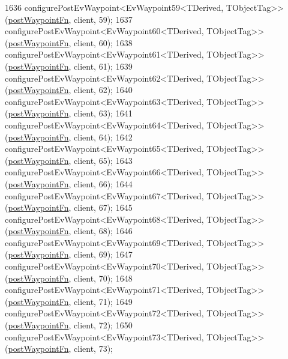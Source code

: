 \begin{DoxyCode}
1636     configurePostEvWaypoint<EvWaypoint59<TDerived, TObjectTag>>(\hyperlink{classsmacc_1_1WaypointEventDispatcher_a6bccf6a93a827634b7b5e67ac0e4ec57}{postWaypointFn}, client, 59);
1637     configurePostEvWaypoint<EvWaypoint60<TDerived, TObjectTag>>(\hyperlink{classsmacc_1_1WaypointEventDispatcher_a6bccf6a93a827634b7b5e67ac0e4ec57}{postWaypointFn}, client, 60);
1638     configurePostEvWaypoint<EvWaypoint61<TDerived, TObjectTag>>(\hyperlink{classsmacc_1_1WaypointEventDispatcher_a6bccf6a93a827634b7b5e67ac0e4ec57}{postWaypointFn}, client, 61);
1639     configurePostEvWaypoint<EvWaypoint62<TDerived, TObjectTag>>(\hyperlink{classsmacc_1_1WaypointEventDispatcher_a6bccf6a93a827634b7b5e67ac0e4ec57}{postWaypointFn}, client, 62);
1640     configurePostEvWaypoint<EvWaypoint63<TDerived, TObjectTag>>(\hyperlink{classsmacc_1_1WaypointEventDispatcher_a6bccf6a93a827634b7b5e67ac0e4ec57}{postWaypointFn}, client, 63);
1641     configurePostEvWaypoint<EvWaypoint64<TDerived, TObjectTag>>(\hyperlink{classsmacc_1_1WaypointEventDispatcher_a6bccf6a93a827634b7b5e67ac0e4ec57}{postWaypointFn}, client, 64);
1642     configurePostEvWaypoint<EvWaypoint65<TDerived, TObjectTag>>(\hyperlink{classsmacc_1_1WaypointEventDispatcher_a6bccf6a93a827634b7b5e67ac0e4ec57}{postWaypointFn}, client, 65);
1643     configurePostEvWaypoint<EvWaypoint66<TDerived, TObjectTag>>(\hyperlink{classsmacc_1_1WaypointEventDispatcher_a6bccf6a93a827634b7b5e67ac0e4ec57}{postWaypointFn}, client, 66);
1644     configurePostEvWaypoint<EvWaypoint67<TDerived, TObjectTag>>(\hyperlink{classsmacc_1_1WaypointEventDispatcher_a6bccf6a93a827634b7b5e67ac0e4ec57}{postWaypointFn}, client, 67);
1645     configurePostEvWaypoint<EvWaypoint68<TDerived, TObjectTag>>(\hyperlink{classsmacc_1_1WaypointEventDispatcher_a6bccf6a93a827634b7b5e67ac0e4ec57}{postWaypointFn}, client, 68);
1646     configurePostEvWaypoint<EvWaypoint69<TDerived, TObjectTag>>(\hyperlink{classsmacc_1_1WaypointEventDispatcher_a6bccf6a93a827634b7b5e67ac0e4ec57}{postWaypointFn}, client, 69);
1647     configurePostEvWaypoint<EvWaypoint70<TDerived, TObjectTag>>(\hyperlink{classsmacc_1_1WaypointEventDispatcher_a6bccf6a93a827634b7b5e67ac0e4ec57}{postWaypointFn}, client, 70);
1648     configurePostEvWaypoint<EvWaypoint71<TDerived, TObjectTag>>(\hyperlink{classsmacc_1_1WaypointEventDispatcher_a6bccf6a93a827634b7b5e67ac0e4ec57}{postWaypointFn}, client, 71);
1649     configurePostEvWaypoint<EvWaypoint72<TDerived, TObjectTag>>(\hyperlink{classsmacc_1_1WaypointEventDispatcher_a6bccf6a93a827634b7b5e67ac0e4ec57}{postWaypointFn}, client, 72);
1650     configurePostEvWaypoint<EvWaypoint73<TDerived, TObjectTag>>(\hyperlink{classsmacc_1_1WaypointEventDispatcher_a6bccf6a93a827634b7b5e67ac0e4ec57}{postWaypointFn}, client, 73);

\end{DoxyCode}
